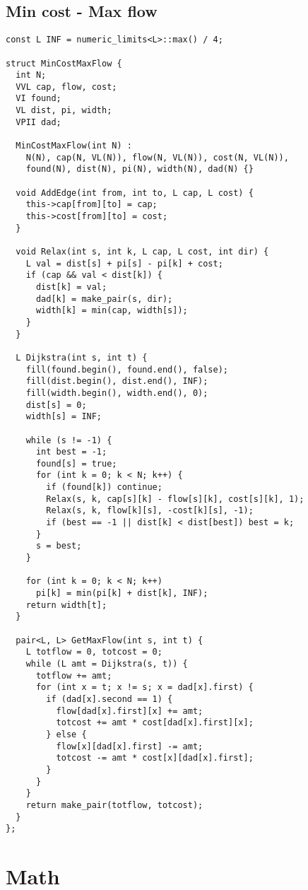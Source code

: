 \documentclass[10pt,letterpaper,twocolumn,twosided]{article}
\begin{document}
\subsection{Min cost - Max flow}

\begin{lstlisting}
const L INF = numeric_limits<L>::max() / 4;

struct MinCostMaxFlow {
  int N;
  VVL cap, flow, cost;
  VI found;
  VL dist, pi, width;
  VPII dad;

  MinCostMaxFlow(int N) : 
    N(N), cap(N, VL(N)), flow(N, VL(N)), cost(N, VL(N)), 
    found(N), dist(N), pi(N), width(N), dad(N) {}
  
  void AddEdge(int from, int to, L cap, L cost) {
    this->cap[from][to] = cap;
    this->cost[from][to] = cost;
  }
  
  void Relax(int s, int k, L cap, L cost, int dir) {
    L val = dist[s] + pi[s] - pi[k] + cost;
    if (cap && val < dist[k]) {
      dist[k] = val;
      dad[k] = make_pair(s, dir);
      width[k] = min(cap, width[s]);
    }
  }

  L Dijkstra(int s, int t) {
    fill(found.begin(), found.end(), false);
    fill(dist.begin(), dist.end(), INF);
    fill(width.begin(), width.end(), 0);
    dist[s] = 0;
    width[s] = INF;
    
    while (s != -1) {
      int best = -1;
      found[s] = true;
      for (int k = 0; k < N; k++) {
        if (found[k]) continue;
        Relax(s, k, cap[s][k] - flow[s][k], cost[s][k], 1);
        Relax(s, k, flow[k][s], -cost[k][s], -1);
        if (best == -1 || dist[k] < dist[best]) best = k;
      }
      s = best;
    }

    for (int k = 0; k < N; k++)
      pi[k] = min(pi[k] + dist[k], INF);
    return width[t];
  }

  pair<L, L> GetMaxFlow(int s, int t) {
    L totflow = 0, totcost = 0;
    while (L amt = Dijkstra(s, t)) {
      totflow += amt;
      for (int x = t; x != s; x = dad[x].first) {
        if (dad[x].second == 1) {
          flow[dad[x].first][x] += amt;
          totcost += amt * cost[dad[x].first][x];
        } else {
          flow[x][dad[x].first] -= amt;
          totcost -= amt * cost[x][dad[x].first];
        }
      }
    }
    return make_pair(totflow, totcost);
  }
};
\end{lstlisting}


\section{Math}
\end{document}

